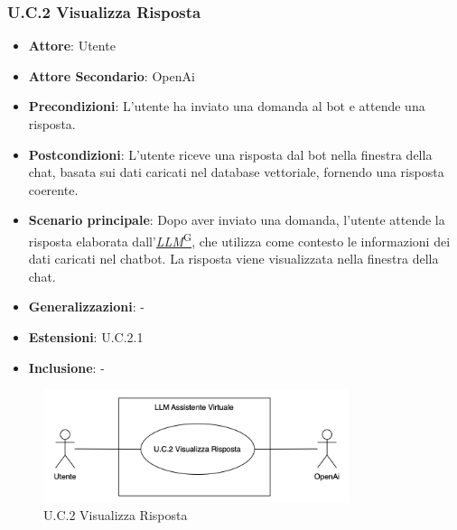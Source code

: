 \subsubsection{U.C.2 Visualizza Risposta}
\begin{itemize}
    \item \textbf{Attore}: Utente
    \item \textbf{Attore Secondario}: OpenAi
    \item \textbf{Precondizioni}:  L'utente ha inviato una domanda al bot e attende una risposta.
    \item \textbf{Postcondizioni}: L'utente riceve una risposta dal bot nella finestra della chat, basata sui dati caricati nel database vettoriale, fornendo una risposta coerente.
    \item \textbf{Scenario principale}: Dopo aver inviato una domanda, l'utente attende la risposta elaborata dall’\href{https://code7crusaders.github.io/docs/RTB/documentazione_interna/glossario.html#llm-large-language-model}{\textit{LLM}\textsuperscript{G}}, che utilizza come contesto le informazioni dei dati caricati nel chatbot. La risposta viene visualizzata nella finestra della chat.
    \item \textbf{Generalizzazioni}: -
    \item \textbf{Estensioni}: U.C.2.1
    \item \textbf{Inclusione}: -
\end{itemize}
\begin{figure}[H]
    \centering
    \includegraphics[width=0.8\textwidth]{img/UC2.png}
    \caption{U.C.2 Visualizza Risposta}
\end{figure}
\newpage

